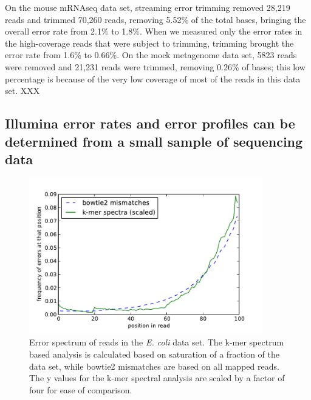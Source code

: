 \documentclass{article}
\begin{document}
%


% 



On the mouse mRNAseq data set, streaming error trimming removed 28,219
reads and trimmed 70,260 reads, removing 5.52\% of the total bases,
bringing the overall error rate from 2.1\% to 1.8\%.  When we measured
only the error rates in the high-coverage reads that were subject to
trimming, trimming brought the error rate from 1.6\% to 0.66\%.
On the mock metagenome data set, 5823 reads were removed and 21,231
reads were trimmed, removing 0.26\% of bases; this low percentage is
because of the very low coverage of most of the reads in this data set.
XXX

\subsection{Illumina error rates and error profiles can be determined from a
small sample of sequencing data}

\begin{figure}[!ht]
 \centerline{\includegraphics[width=4in]{./figures/ecoli-errhist}}
\caption{Error spectrum of reads in the {\em E. coli} data set. The
  k-mer spectrum based analysis is calculated based on saturation of a
  fraction of the data set, while bowtie2 mismatches are based on all
  mapped reads.  The y values for the k-mer spectral analysis are
  scaled by a factor of four for ease of comparison.}
\label{fig:ecoli_err}
\end{figure}
\end{document}

